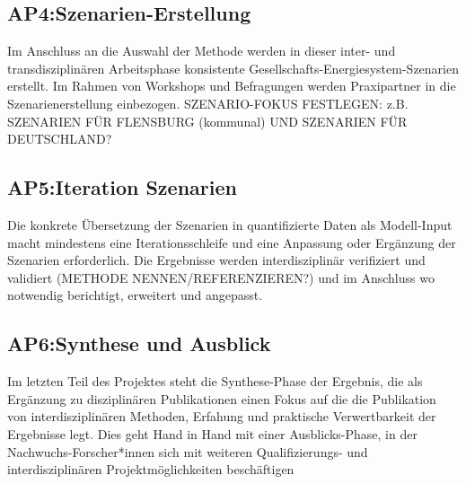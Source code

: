 \documentclass[a4paper,11pt,twoside]{scrartcl}
\begin{document}
\subsection*{AP4:Szenarien-Erstellung}
Im Anschluss an die Auswahl der Methode werden in dieser inter- und transdisziplinären Arbeitsphase konsistente Gesellschafts-Energiesystem-Szenarien erstellt. Im Rahmen von Workshops und Befragungen werden Praxipartner in die Szenarienerstellung einbezogen. SZENARIO-FOKUS FESTLEGEN: z.B. SZENARIEN FÜR FLENSBURG (kommunal) UND SZENARIEN FÜR DEUTSCHLAND?

\subsection*{AP5:Iteration Szenarien}
Die konkrete Übersetzung der Szenarien in quantifizierte Daten als Modell-Input macht mindestens eine Iterationsschleife und eine Anpassung oder Ergänzung der Szenarien erforderlich. Die Ergebnisse werden interdisziplinär verifiziert und validiert (METHODE NENNEN/REFERENZIEREN?) und im Anschluss wo notwendig berichtigt, erweitert und angepasst.

\subsection*{AP6:Synthese und Ausblick}
Im letzten Teil des Projektes steht die Synthese-Phase der Ergebnis, die als Ergänzung zu disziplinären Publikationen einen Fokus auf die die Publikation von interdisziplinären Methoden, Erfahung und praktische Verwertbarkeit der Ergebnisse legt. Dies geht Hand in Hand mit einer Ausblicks-Phase, in der Nachwuchs-Forscher*innen sich mit weiteren Qualifizierungs- und interdisziplinären Projektmöglichkeiten beschäftigen
\end{document}
